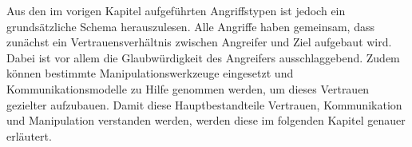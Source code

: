 Aus den im vorigen Kapitel aufgeführten Angriffstypen ist jedoch ein grundsätzliche Schema herauszulesen.
Alle Angriffe haben gemeinsam, dass zunächst ein Vertrauensverhältnis zwischen Angreifer und Ziel aufgebaut wird.
Dabei ist vor allem die Glaubwürdigkeit des Angreifers ausschlaggebend.
Zudem können bestimmte Manipulationswerkzeuge eingesetzt und Kommunikationsmodelle zu Hilfe genommen werden, um dieses Vertrauen gezielter aufzubauen.
Damit diese Hauptbestandteile Vertrauen, Kommunikation und Manipulation verstanden werden, werden diese im folgenden Kapitel genauer erläutert.


